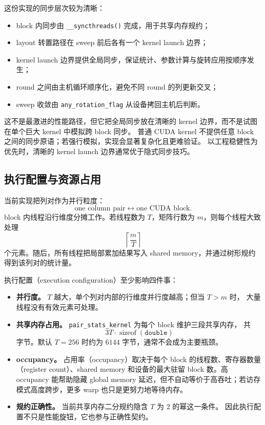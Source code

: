 这份实现的同步层次较为清晰：

\begin{itemize}
    \item block 内同步由 \texttt{\_\_syncthreads()} 完成，用于共享内存规约；
    \item layout 转置路径在 sweep 前后各有一个 kernel launch 边界；
    \item kernel launch 边界提供全局同步，保证统计、参数计算与旋转应用按顺序发生；
    \item round 之间由主机循环顺序化，避免不同 round 的列更新交叉；
    \item sweep 收敛由 \texttt{any\_rotation\_flag} 从设备拷回主机后判断。
\end{itemize}

这不是最激进的性能路径，但它把全局同步放在清晰的 kernel 边界，而不是试图在单个巨大 kernel 中模拟跨 block 同步。
普通 CUDA kernel 不提供任意 block 之间的同步原语；若强行模拟，实现会显著复杂化且更难验证。
以工程稳健性为优先时，清晰的 kernel launch 边界通常优于隐式同步技巧。

\subsection{执行配置与资源占用}

当前实现把列对作为并行粒度：
\[
    \text{one column pair}
    \longleftrightarrow
    \text{one CUDA block}.
\]
block 内线程沿行维度分摊工作。若线程数为 \(T\)，矩阵行数为 \(m\)，则每个线程大致处理
\[
    \left\lceil \frac{m}{T}\right\rceil
\]
个元素。随后，所有线程把局部累加结果写入 shared memory，并通过树形规约得到该列对的统计量。

执行配置（execution configuration）至少影响四件事：

\begin{itemize}
    \item \textbf{并行度。} \(T\) 越大，单个列对内部的行维度并行度越高；但当 \(T>m\) 时，
          大量线程没有有效元素可处理。
    \item \textbf{共享内存占用。} \texttt{pair\_stats\_kernel} 为每个 block 维护三段共享内存，
          共
          \[
              3T\cdot \operatorname{sizeof}(\texttt{double})
          \]
          字节。默认 \(T=256\) 时约为 \(6144\) 字节，通常不会成为主要瓶颈。
    \item \textbf{occupancy。} 占用率（occupancy）取决于每个 block 的线程数、寄存器数量
          （register count）、shared memory 和设备的最大驻留 block 数。高 occupancy 能帮助隐藏
          global memory 延迟，但不自动等价于高吞吐；若访存模式高度跨步，更多 warp 也只是更努力地等待内存。
    \item \textbf{规约正确性。} 当前共享内存二分规约隐含 \(T\) 为 \(2\) 的幂这一条件。
          因此执行配置不只是性能旋钮，它也参与正确性契约。
\end{itemize}

